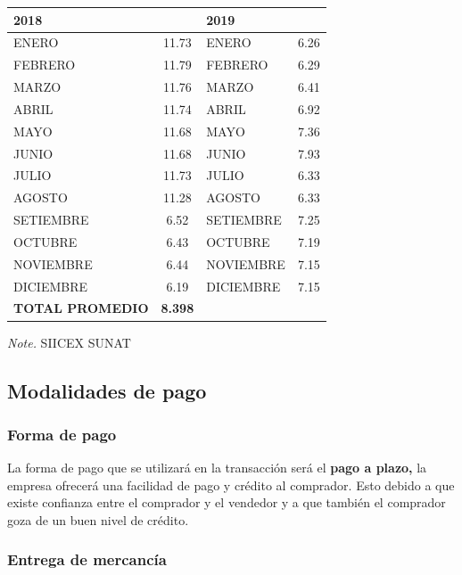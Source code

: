 \documentclass[
  stu,
  floatsintext,
  longtable,
  a4paper,
  nolmodern,
  notxfonts,
  notimes,
  colorlinks=true,linkcolor=blue,citecolor=blue,urlcolor=blue]{apa7}
\begin{document}
\begin{table}

{\caption{{Precio FOB promedio de las exportaciones de PERÚ en los
últimos 2 años hacia EE. UU}{\label{tbl-mytable2}}}}

\begin{longtable}[]{@{}lclc@{}}
\toprule\noalign{}
\textbf{2018} & & \textbf{2019} & \\
\midrule\noalign{}
\endhead
\bottomrule\noalign{}
\endlastfoot
ENERO & 11.73 & ENERO & 6.26 \\
FEBRERO & 11.79 & FEBRERO & 6.29 \\
MARZO & 11.76 & MARZO & 6.41 \\
ABRIL & 11.74 & ABRIL & 6.92 \\
MAYO & 11.68 & MAYO & 7.36 \\
JUNIO & 11.68 & JUNIO & 7.93 \\
JULIO & 11.73 & JULIO & 6.33 \\
AGOSTO & 11.28 & AGOSTO & 6.33 \\
SETIEMBRE & 6.52 & SETIEMBRE & 7.25 \\
OCTUBRE & 6.43 & OCTUBRE & 7.19 \\
NOVIEMBRE & 6.44 & NOVIEMBRE & 7.15 \\
DICIEMBRE & 6.19 & DICIEMBRE & 7.15 \\
\textbf{TOTAL PROMEDIO} & \textbf{8.398} & & \\
\end{longtable}

{\noindent \emph{Note.} SIICEX SUNAT}

\end{table}

\subsection{Modalidades de pago}\label{modalidades-de-pago}

\subsubsection{Forma de pago}\label{forma-de-pago}

La forma de pago que se utilizará en la transacción será el \textbf{pago
a plazo,} la empresa ofrecerá una facilidad de pago y crédito al
comprador. Esto debido a que existe confianza entre el comprador y el
vendedor y a que también el comprador goza de un buen nivel de crédito.

\subsubsection{Entrega de mercancía}\label{entrega-de-mercancuxeda}
\end{document}

